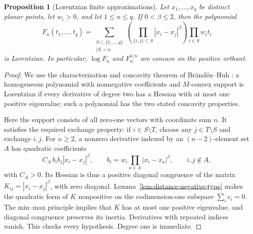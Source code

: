\documentclass[11pt]{article}
\newtheorem{proposition}[theorem]{Proposition}
\theoremstyle{remark}\newtheorem{remark}[theorem]{Remark}
\begin{document}
\begin{proposition}[Lorentzian finite approximations]
\label{prop:finite-lorentzian}
Let $x_1,\ldots,x_q$ be distinct planar points, let $w_i>0$, and let
$1\le n\le q$.  If $0<\beta\le2$, then the polynomial
\[
 F_n(t_1,\ldots,t_q)=
 \sum_{\substack{S\subset\{1,\ldots,q\}\\|S|=n}}
  \left(\prod_{\{i,j\}\subset S}|x_i-x_j|^\beta\right)
  \prod_{i\in S}w_it_i
\]
is Lorentzian.  In particular, $\log F_n$ and $F_n^{1/n}$ are concave
on the positive orthant.
\end{proposition}

\begin{proof}
We use the characterization and concavity theorem of
Br\"and\'en--Huh \cite[Theorems 2.25 and 2.30, Proposition 2.33]{BrandenHuh}:
a homogeneous polynomial with nonnegative coefficients and
$M$-convex support is Lorentzian if every derivative of degree two
has a Hessian with at most one positive eigenvalue; such a polynomial
has the two stated concavity properties.

Here the support consists of all zero-one vectors with coordinate sum
$n$.  It satisfies the required exchange property: if $i\in S\setminus
T$, choose any $j\in T\setminus S$ and exchange $i,j$.
For $n\ge2$, a nonzero derivative indexed by an $(n-2)$-element set
$A$ has quadratic coefficients
\[
 C_A\,b_i b_j |x_i-x_j|^\beta,
 \qquad
 b_i=w_i\prod_{a\in A}|x_i-x_a|^\beta,
 \qquad i,j\notin A,
\]
with $C_A>0$.  Its Hessian is thus a positive diagonal congruence of
the matrix $K_{ij}=|x_i-x_j|^\beta$, with zero diagonal.
Lemma~\ref{lem:distance-negative-type} makes the quadratic form of $K$
nonpositive on the codimension-one subspace $\sum_i c_i=0$.
The min--max principle implies that $K$ has at most one positive
eigenvalue, and diagonal congruence preserves its inertia.  Derivatives
with repeated indices vanish.  This checks every hypothesis.  Degree
one is immediate.
\end{proof}
\end{document}
